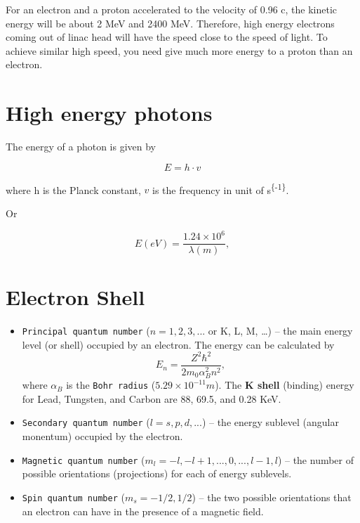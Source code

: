 \documentclass[]{book}
\providecommand{\tightlist}{%
  \setlength{\itemsep}{0pt}\setlength{\parskip}{0pt}}
\theoremstyle{definition}
\theoremstyle{definition}
\theoremstyle{definition}
\theoremstyle{remark}
\begin{document}
For an electron and a proton accelerated to the velocity of 0.96 c, the
kinetic energy will be about 2 MeV and 2400 MeV. Therefore, high energy
electrons coming out of linac head will have the speed close to the
speed of light. To achieve similar high speed, you need give much more
energy to a proton than an electron.

\section{High energy photons}\label{high-energy-photons}

The energy of a photon is given by

\begin{equation}
    E = h\cdot v
    \label{eq:frequency}
\end{equation}

where h is the Planck constant, \(v\) is the frequency in unit of
s\textsuperscript{\{-1\}}.

Or

\begin{equation}
    E (eV) = \frac{1.24\times 10^{6}}{\lambda (m)}, 
    \label{eq:wavelength}
\end{equation}

\section{Electron Shell}\label{electron-shell}

\begin{itemize}
\tightlist
\item
  \texttt{Principal\ quantum\ number} (\(n = 1, 2, 3, ...\) or K, L, M,
  \ldots{}) -- the main energy level (or shell) occupied by an electron.
  The energy can be calculated
  by\[E_n=\frac{Z^2{\hbar}^2}{2m_0\alpha^2_Bn^2},\] where \(\alpha_B\)
  is the \texttt{Bohr\ radius} (\(5.29 \times 10^{-11}m\)). The
  \textbf{K shell} (binding) energy for Lead, Tungsten, and Carbon are
  88, 69.5, and 0.28 KeV.
\item
  \texttt{Secondary\ quantum\ number} (\(l = s, p, d, ...\)) -- the
  energy sublevel (angular monentum) occupied by the electron.
\item
  \texttt{Magnetic\ quantum\ number}
  (\(m_l = -l, -l+1, ..., 0, ..., l-1, l\)) -- the number of possible
  orientations (projections) for each of energy sublevels.
\item
  \texttt{Spin\ quantum\ number} (\(m_s=-1/2, 1/2\)) -- the two possible
  orientations that an electron can have in the presence of a magnetic
  field.
\end{itemize}
\end{document}
